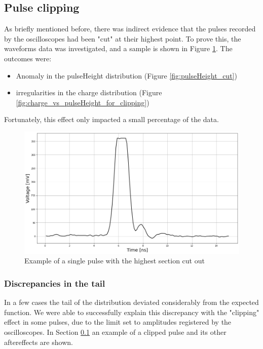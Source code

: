\subsection{Pulse clipping}\label{sec:pulse_clipping}

As briefly mentioned before, there was indirect evidence that the pulses recorded by the oscilloscopes had been "cut" at their highest point. To prove this, the waveforms data was investigated, and a sample is shown in Figure \ref{fig:clipped_pulse}. The outcomes were:

\begin{itemize}
    \item Anomaly in the pulseHeight distribution (Figure \ref{fig:pulseHeight_cut})
    \item irregularities in the charge distribution (Figure \ref{fig:charge_vs_pulseHeight_for_clipping})
\end{itemize}
Fortunately, this effect only impacted a small percentage of the data.

\begin{figure}[!ht]
    \centering
    \includegraphics[width=.9\linewidth]{Images/detailed_analysis/Waveform of clipped pulse (ns).png}
    \caption{Example of a single pulse with the highest section cut out}
    \label{fig:clipped_pulse}
\end{figure}
 

\subsubsection{Discrepancies in the tail}\label{subsec:tail_discrepancies}
In a few cases the tail of the distribution deviated considerably from the expected function. We were able to successfully explain this discrepancy with the "clipping" effect in some pulses, due to the limit set to amplitudes registered by the oscilloscopes.
In Section \ref{sec:pulse_clipping} an example of a clipped pulse and its other aftereffects are shown.

